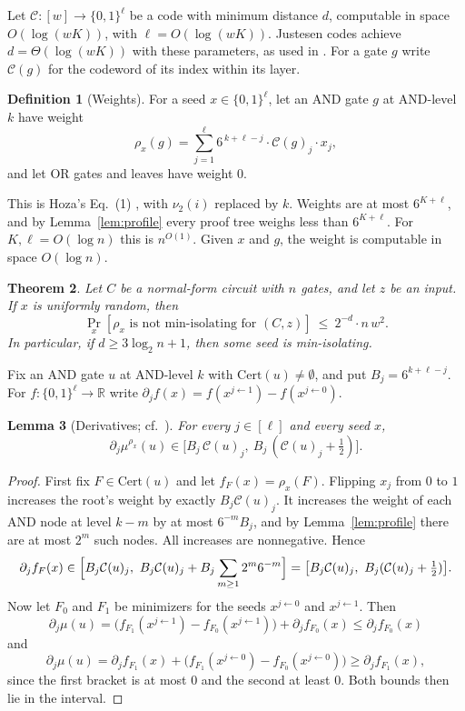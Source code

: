 \documentclass[11pt,letterpaper]{article}
\newtheorem{theorem}{Theorem}
\newtheorem{lemma}[theorem]{Lemma}
\theoremstyle{definition}
\newtheorem{definition}[theorem]{Definition}
\theoremstyle{remark}
\newcommand{\Cert}{\mathrm{Cert}}
\begin{document}
Let $\mathcal C\colon[w]\to\{0,1\}^\ell$ be a code with minimum distance $d$,
computable in space $O(\log(wK))$, with $\ell=O(\log(wK))$. Justesen codes
\cite{Justesen} achieve $d=\Theta(\log(wK))$ with these parameters, as used in
\cite{Hoza}. For a gate $g$ write $\mathcal C(g)$ for the codeword of its index
within its layer.

\begin{definition}[Weights]\label{def:weights}
For a seed $x\in\{0,1\}^\ell$, let an AND gate $g$ at AND-level $k$ have weight
\[
 \rho_x(g)=\sum_{j=1}^{\ell} 6^{\,k+\ell-j}\cdot\mathcal C(g)_j\cdot x_j ,
\]
and let OR gates and leaves have weight $0$.
\end{definition}

This is Hoza's Eq.~(1) \cite{Hoza}, with $\nu_2(i)$ replaced by $k$. Weights are at
most $6^{K+\ell}$, and by Lemma~\ref{lem:profile} every proof tree weighs less than
$6^{K+\ell}$. For $K,\ell=O(\log n)$ this is $n^{O(1)}$. Given $x$ and $g$, the
weight is computable in space $O(\log n)$.

\begin{theorem}\label{thm:generator}
Let $C$ be a normal-form circuit with $n$ gates, and let $z$ be an input. If $x$ is
uniformly random, then
\[
 \Pr_x[\rho_x \text{ is not min-isolating for }(C,z)]\ \le\ 2^{-d}\cdot n\,w^2 .
\]
In particular, if $d\ge 3\log_2 n+1$, then some seed is min-isolating.
\end{theorem}

Fix an AND gate $u$ at AND-level $k$ with $\Cert(u)\ne\emptyset$, and put
$B_j=6^{k+\ell-j}$. For $f\colon\{0,1\}^\ell\to\mathbb R$ write $\partial_j
f(x)=f(x^{j\leftarrow1})-f(x^{j\leftarrow0})$.

\begin{lemma}[Derivatives; cf.\ {\cite[Lemma~2.3]{Hoza}}]\label{lem:deriv}
For every $j\in[\ell]$ and every seed $x$,
\[
 \partial_j\mu^{\rho_x}(u)\in\bigl[B_j\,\mathcal C(u)_j,\ B_j\,(\mathcal C(u)_j+\tfrac12)\bigr].
\]
\end{lemma}
\begin{proof}
First fix $F\in\Cert(u)$ and let $f_F(x)=\rho_x(F)$. Flipping $x_j$ from $0$ to
$1$ increases the root's weight by exactly $B_j\mathcal C(u)_j$. It increases
the weight of each AND node at level $k-m$ by at most $6^{-m}B_j$, and by
Lemma~\ref{lem:profile} there are at most $2^m$ such nodes. All increases are
nonnegative. Hence
\[
 \partial_j f_F(x)\in\Bigl[B_j\mathcal C(u)_j,\ B_j\mathcal C(u)_j+B_j\sum_{m\ge1}2^m6^{-m}\Bigr]
 =\bigl[B_j\mathcal C(u)_j,\ B_j(\mathcal C(u)_j+\tfrac12)\bigr].
\]
Now let $F_0$ and $F_1$ be minimizers for the seeds $x^{j\leftarrow0}$ and
$x^{j\leftarrow1}$. Then
\[
 \partial_j\mu(u)=\bigl(f_{F_1}(x^{j\leftarrow1})-f_{F_0}(x^{j\leftarrow1})\bigr)+\partial_jf_{F_0}(x)\le\partial_jf_{F_0}(x)
\]
and
\[
 \partial_j\mu(u)=\partial_jf_{F_1}(x)+\bigl(f_{F_1}(x^{j\leftarrow0})-f_{F_0}(x^{j\leftarrow0})\bigr)\ge\partial_jf_{F_1}(x),
\]
since the first bracket is at most $0$ and the second at least $0$. Both bounds then lie in the interval.
\end{proof}
\end{document}
